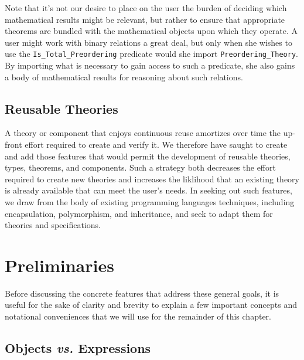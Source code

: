 Note that it's not our desire to place on the user the burden of deciding which mathematical results might be relevant, but rather to ensure that appropriate theorems are bundled with the mathematical objects upon which they operate.  A user might work with binary relations a great deal, but only when she wishes to use the \texttt{Is\_Total\_Preordering} predicate would she import \texttt{Preordering\_Theory}.  By importing what is necessary to gain access to such a predicate, she also gains a body of mathematical results for reasoning about such relations.

	\subsection{Reusable Theories\label{reusableTheories}}

A theory or component that enjoys continuous reuse amortizes over time the up-front effort required to create and verify it.  We therefore have saught to create and add those features that would permit the development of reusable theories, types, theorems, and components.  Such a strategy both decreases the effort required to create new theories and increases the liklihood that an existing theory is already available that can meet the user's needs.  In seeking out such features, we draw from the body of existing programming languages techniques, including encapsulation, polymorphism, and inheritance, and seek to adapt them for theories and specifications.


\section{Preliminaries\label{preliminaries}}

Before discussing the concrete features that address these general goals, it is useful for the sake of clarity and brevity to explain a few important concepts and notational conveniences that we will use for the remainder of this chapter.
	\subsection{Objects \emph{vs.} Expressions\label{objectsVsExpressions}}


